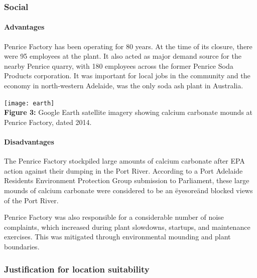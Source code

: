 \documentclass[12pt, a4paper]{article}
\begin{document}
\subsubsection{Social}

\paragraph{Advantages}
Penrice Factory has been operating for 80 years. At the time of its closure, there were 95 employees at the plant. It also acted as major demand source for the nearby Penrice quarry, with 180 employees across the former Penrice Soda Products corporation. It was important for local jobs in the community and the economy in north-western Adelaide, was the only soda ash plant in Australia.

\begin{center}
\texttt{[image: earth]}
\\
\textbf{Figure 3:} Google Earth satellite imagery showing calcium carbonate mounds at Penrice Factory, dated 2014. 
\end{center}

\paragraph{Disadvantages}

The Penrice Factory stockpiled large amounts of calcium carbonate after EPA action against their dumping in the Port River. According to a Port Adelaide Residents Environment Protection Group submission to Parliament, these large mounds of calcium carbonate were considered to be an \"eyesore\" and blocked views of the Port River. 

Penrice Factory was also responsible for a considerable number of noise complaints, which increased during plant slowdowns, startups, and maintenance exercises. This was mitigated through environmental mounding and plant boundaries.

\subsubsection{Justification for location suitability}
\end{document}

